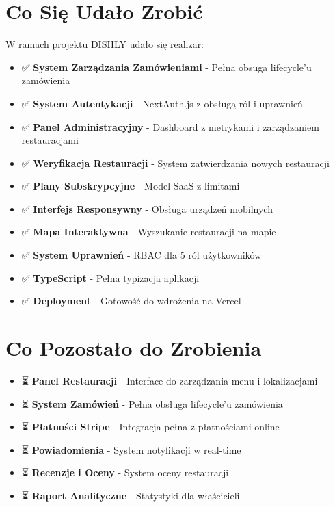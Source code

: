 \documentclass[12pt,a4paper,utf-8]{article}
\begin{document}
\section{Co Się Udało Zrobić}

W ramach projektu DISHLY udało się realizar:

\begin{itemize}
    \item ✅ \textbf{System Zarządzania Zamówieniami}  -  Pełna obsuga lifecycle'u zamówienia
    \item ✅ \textbf{System Autentykacji}  -  NextAuth.js z obsługą ról i uprawnień
    \item ✅ \textbf{Panel Administracyjny}  -  Dashboard z metrykami i zarządzaniem restauracjami
    \item ✅ \textbf{Weryfikacja Restauracji}  -  System zatwierdzania nowych restauracji
    \item ✅ \textbf{Plany Subskrypcyjne}  -  Model SaaS z limitami
    \item ✅ \textbf{Interfejs Responsywny}  -  Obsługa urządzeń mobilnych
    \item ✅ \textbf{Mapa Interaktywna}  -  Wyszukanie restauracji na mapie
    \item ✅ \textbf{System Uprawnień}  -  RBAC dla 5 ról użytkowników
    \item ✅ \textbf{TypeScript}  -  Pełna typizacja aplikacji
    \item ✅ \textbf{Deployment}  -  Gotowość do wdrożenia na Vercel
\end{itemize}

\section{Co Pozostało do Zrobienia}

\begin{itemize}
    \item ⏳ \textbf{Panel Restauracji}  -  Interface do zarządzania menu i lokalizacjami
    \item ⏳ \textbf{System Zamówień}  -  Pełna obsługa lifecycle'u zamówienia
    \item ⏳ \textbf{Płatności Stripe}  -  Integracja pełna z płatnościami online
    \item ⏳ \textbf{Powiadomienia}  -  System notyfikacji w real-time
    \item ⏳ \textbf{Recenzje i Oceny}  -  System oceny restauracji
    \item ⏳ \textbf{Raport Analityczne}  -  Statystyki dla właścicieli
\end{itemize}
\end{document}
